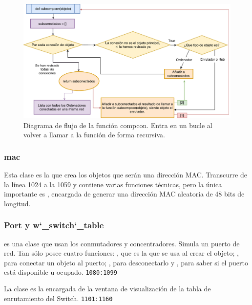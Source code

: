 \documentclass[a4paper, 11pt]{report} %
\begin{document}
\begin{figure}[H]
\noindent\centering
\includegraphics[width=\textwidth]{Resources/Diagramas/Compcon}
\caption[Diagrama de flujo de la función compcon]{Diagrama de flujo de la función compcon. Entra en un bucle al volver a llamar a la función de forma recursiva.}
\end{figure}

\subsubsection{mac}
Esta clase es la que crea los objetos que serán una dirección MAC. Transcurre de la línea 1024 a la 1059 y contiene varias funciones técnicas, pero la única importante es , encargada de generar una dirección MAC aleatoria de 48 bits de longitud.
\subsubsection{Port y w\char`_switch\char`_table}
 es una clase que usan los conmutadores y concentradores. Simula un puerto de red. Tan sólo posee cuatro funciones: , que es la que se usa al crear el objeto; , para conectar un objeto al puerto; , para desconectarlo y , para saber si el puerto está disponible u ocupado. \texttt{1080:1099}

La clase  es la encargada de la ventana de visualización de la tabla de enrutamiento del Switch. \texttt{1101:1160}
\end{document}
